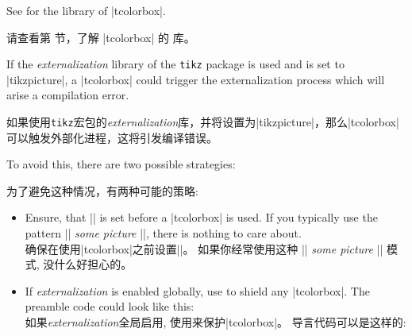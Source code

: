 \begin{marker}
See  for the  library of |tcolorbox|.

请查看第  节，了解 |tcolorbox| 的  库。
\end{marker}

If the \emph{externalization} library of the \texttt{tikz} package is used
and  is set to |tikzpicture|,
a |tcolorbox| could trigger the externalization process which will arise
a compilation error.

如果使用\texttt{tikz}宏包的\emph{externalization}库，并将设置为|tikzpicture|，那么|tcolorbox|可以触发外部化进程，这将引发编译错误。



To avoid this, there are two possible strategies:

为了避免这种情况，有两种可能的策略:
\begin{itemize}
\item 
Ensure, that |\tikzexternaldisable| is set before a |tcolorbox| is used.
If you typically use the pattern |\tikzexternalenable| \textit{some picture} |\tikzexternaldisable|,
there is nothing to care about.
\\确保在使用|tcolorbox|之前设置|\tikzexternaldisable|。%
如果你经常使用这种 |\tikzexternalenable| \textit{some picture} |\tikzexternaldisable| 模式,
没什么好担心的。
\item 
If \emph{externalization} is enabled globally, use  to
shield any |tcolorbox|. The preamble code could look like this:
\\如果\emph{externalization}全局启用, 使用来保护|tcolorbox|。%
导言代码可以是这样的:
\begin{dispListing}
\usetikzlibrary{external}
\tikzexternalize
{}
\end{dispListing}
\end{itemize}

